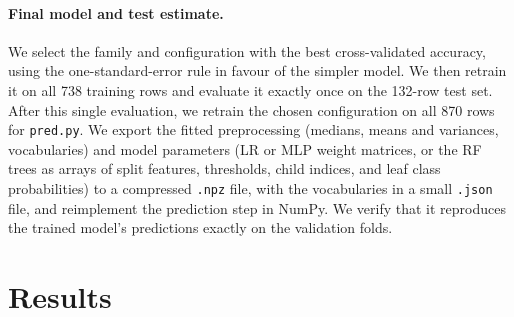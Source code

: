 \documentclass[11pt,letterpaper]{article}
\begin{document}
\paragraph{Final model and test estimate.}
We select the family and configuration with the best cross-validated accuracy,
using the one-standard-error rule in favour of the simpler model. We then retrain
it on all 738 training rows and evaluate it exactly once on the 132-row test set.
After this single evaluation, we retrain the chosen configuration on all 870 rows
for \texttt{pred.py}. We export the fitted preprocessing (medians, means and
variances, vocabularies) and model parameters (LR or MLP weight matrices, or the RF
trees as arrays of split features, thresholds, child indices, and leaf class
probabilities) to a compressed \texttt{.npz} file, with the vocabularies in a small
\texttt{.json} file, and reimplement the prediction step in NumPy. We verify that it
reproduces the trained model's predictions exactly on the validation folds.

\section{Results}\label{sec:results}
%
%
%
%
%
%
\end{document}
